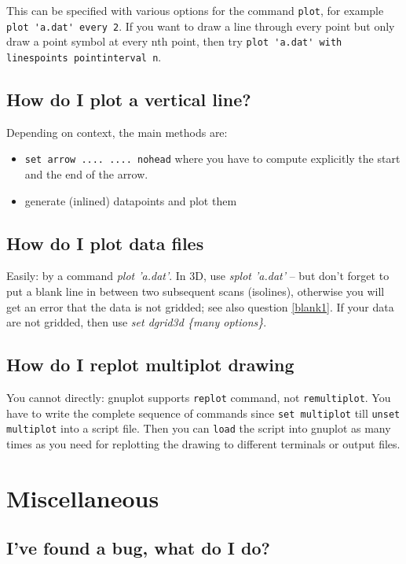 \documentclass[a4paper,11pt]{article}
\begin{document}
This can be specified with various options for the command \verb+plot+,
for example \verb+plot 'a.dat' every 2+.  If you want to draw a line 
through every point but only draw a point symbol at every nth point,
then try \verb+plot 'a.dat' with linespoints pointinterval n+.


\subsection{How do I plot a vertical line?}

Depending on context, the main methods are:
\begin{itemize}
\item \verb+set arrow .... .... nohead+ where you have to compute
explicitly the start and the end of the arrow.
\item generate (inlined) datapoints and plot them
\end{itemize}


\subsection{How do I plot data files}

Easily: by a command \textit{plot 'a.dat'}. In 3D, use \textit{splot 'a.dat'} --
but don't forget to put a blank line in between two subsequent scans (isolines),
otherwise you will get an error that the data is not gridded; see also question 
\ref{blank1}. If your data are not gridded, then use \textit{set dgrid3d \{many
options\}}.


\subsection{How do I replot multiplot drawing}

You cannot directly: gnuplot supports \verb+replot+ command, not
\verb+remultiplot+. You have to write the complete sequence of commands since
\verb+set multiplot+ till \verb+unset multiplot+ into a script file. Then
you can \verb+load+ the script into gnuplot as many times as you need for
replotting the drawing to different terminals or output files.


\section{Miscellaneous}

\subsection{I've found a bug, what do I do?}
\end{document}
